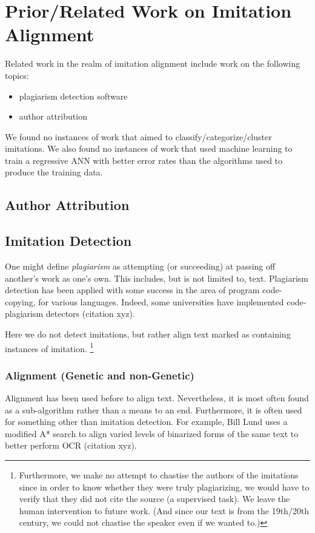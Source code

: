 \section {Prior/Related Work on Imitation Alignment}
Related work in the realm of imitation alignment include work on the following topics:
	\begin{itemize}
		\item plagiarism detection software
		\item author attribution
	\end{itemize}

We found no instances of work that aimed to classify/categorize/cluster imitations. We also found no instances of work that used machine learning to train a regressive ANN with better error rates than the algorithms used to produce the training data.


\subsection{Author Attribution}

\subsection{Imitation Detection}
One might define \textit{plagiarism} as attempting (or succeeding) at passing off another's work as one's own. This includes, but is not limited to, text. Plagiarism detection has been applied with some success in the area of program code-copying, for various languages. Indeed, some universities have implemented code-plagiarism detectors (citation xyz).

Here we do not detect imitations, but rather align text marked as containing instances of imitation. \footnote{Furthermore, we make no attempt to chastise the authors of the imitations since in order to know whether they were truly plagiarizing, we would have to verify that they did not cite the source (a supervised task). We leave the human intervention to future work. (And since our text is from the 19th/20th century, we could not chastise the speaker even if we wanted to.)}

\subsubsection{Alignment (Genetic and non-Genetic)}
Alignment has been used before to align text. Nevertheless, it is most often found as a sub-algorithm rather than a means to an end. Furthermore, it is often used for something other than imitation detection. For example, Bill Lund uses a modified A* search to align varied levels of binarized forms of the same text to better perform OCR (citation xyz).


